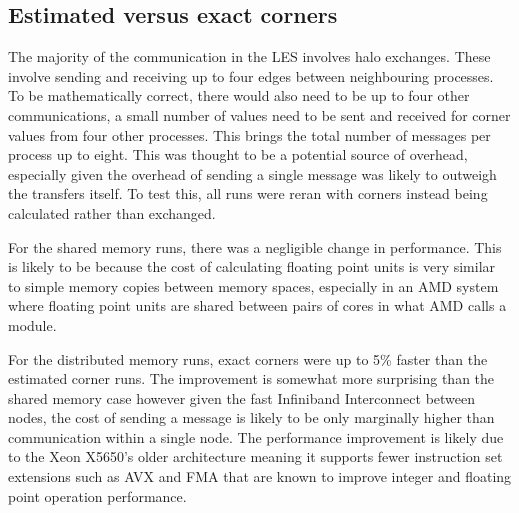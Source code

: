 \subsection{Estimated versus exact corners}

The majority of the communication in the LES involves halo exchanges. These
involve sending and receiving up to four edges between neighbouring processes.
To be mathematically correct, there would also need to be up to four other
communications, a small number of values need to be sent and received for corner
values from four other processes. This brings the total number of messages per
process up to eight. This was thought to be a potential source of overhead,
especially given the overhead of sending a single message was likely to outweigh
the transfers itself. To test this, all runs were reran with corners instead
being calculated rather than exchanged.

For the shared memory runs, there was a negligible change in performance. This
is likely to be because the cost of calculating floating point units is very
similar to simple memory copies between memory spaces, especially in an AMD
system where floating point units are shared between pairs of cores in what AMD
calls a module.

For the distributed memory runs, exact corners were up to 5\% faster than the
estimated corner runs. The improvement is somewhat more surprising than the
shared memory case however given the fast Infiniband Interconnect between nodes,
the cost of sending a message is likely to be only marginally higher than
communication within a single node. The performance improvement is likely due to
the Xeon X5650's older architecture meaning it supports fewer instruction set
extensions such as AVX and FMA that are known to improve integer and floating
point operation performance.
